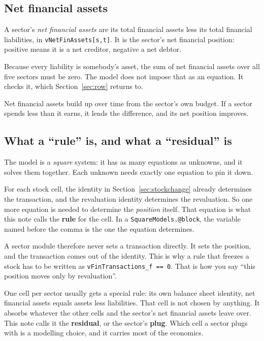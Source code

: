 \documentclass[11pt,a4paper]{article}
\begin{document}
\subsection{Net financial assets}

A sector's \emph{net financial assets} are its total financial assets less its
total financial liabilities, in \texttt{vNetFinAssets[s,t]}. It is the sector's net
financial position: positive means it is a net creditor, negative a net debtor.

Because every liability is somebody's asset, the sum of net financial assets over
all five sectors must be zero. The model does not impose that as an equation. It
checks it, which Section~\ref{sec:row} returns to.

Net financial assets build up over time from the sector's own budget. If a sector
spends less than it earns, it lends the difference, and its net position improves.

\subsection{What a ``rule'' is, and what a ``residual'' is}

The model is a \emph{square} system: it has as many equations as unknowns, and it
solves them together. Each unknown needs exactly one equation to pin it down.

For each stock cell, the identity in Section~\ref{sec:stockchange} already determines the
transaction, and the revaluation identity determines the revaluation. So one more
equation is needed to determine the \emph{position} itself. That equation is what
this note calls the \textbf{rule} for the cell. In a
\texttt{SquareModels.@block}, the variable named before the comma is the one the
equation determines.

A sector module therefore never sets a transaction directly. It sets the position,
and the transaction comes out of the identity. This is why a rule that freezes a
stock has to be written as \texttt{vFinTransactions\_f == 0}. That is how you say
``this position moves only by revaluation''.

One cell per sector usually gets a special rule: its own balance sheet identity,
net financial assets equals assets less liabilities. That cell is not chosen by
anything. It absorbs whatever the other cells and the sector's net financial
assets leave over. This note calls it the \textbf{residual}, or the sector's
\textbf{plug}. Which cell a sector plugs with is a modelling choice, and it carries
most of the economics.
\end{document}
